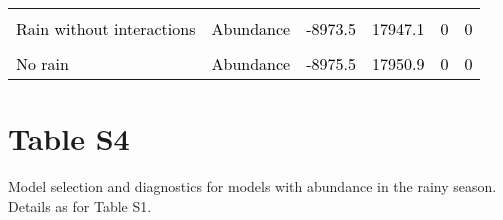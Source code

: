 \documentclass[
  12pt,
  letterpaper,
  DIV=11,
  numbers=noendperiod]{scrartcl}
\begin{document}
\begin{table}[H]
{\begin{tabular}[t]{llllll}
\cellcolor{gray!6}{\textcolor{black}{Rain without interactions}} & \cellcolor{gray!6}{\textcolor{black}{Basal area}} & \cellcolor{gray!6}{\textcolor{black}{-8973.2}} & \cellcolor{gray!6}{\textcolor{black}{17946.4}} & \cellcolor{gray!6}{\textcolor{black}{0}} & \cellcolor{gray!6}{\textcolor{black}{0}}\\
\textcolor{black}{Rain without interactions} & \textcolor{black}{Abundance} & \textcolor{black}{-8973.5} & \textcolor{black}{17947.1} & \textcolor{black}{0} & \textcolor{black}{0}\\
\addlinespace
\cellcolor{gray!6}{\textcolor{black}{No rain}} & \cellcolor{gray!6}{\textcolor{black}{Basal area}} & \cellcolor{gray!6}{\textcolor{black}{-8974.3}} & \cellcolor{gray!6}{\textcolor{black}{17948.7}} & \cellcolor{gray!6}{\textcolor{black}{0}} & \cellcolor{gray!6}{\textcolor{black}{0}}\\
\textcolor{black}{No rain} & \textcolor{black}{Abundance} & \textcolor{black}{-8975.5} & \textcolor{black}{17950.9} & \textcolor{black}{0} & \textcolor{black}{0}\\
\bottomrule
\end{tabular}}
\end{table}

\newpage

\hypertarget{table-s4}{%
\section{Table S4}\label{table-s4}}

Model selection and diagnostics for models with abundance in the rainy
season. Details as for Table S1.
\end{document}
